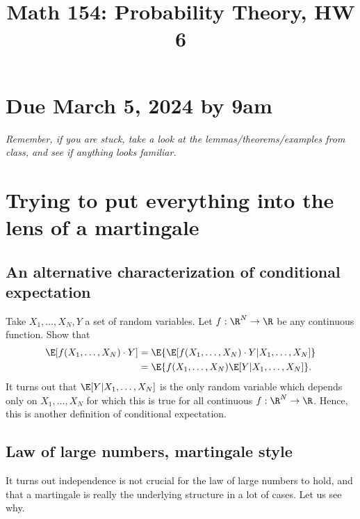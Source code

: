 \documentclass[12pt,reqno]{amsart}
\title{\Large Math 154: Probability Theory, HW 6\vspace{-0.1cm}}
\theoremstyle{definition}
\theoremstyle{remark}
\numberwithin{equation}{section}
\newenvironment{nouppercase}{%
  \let\uppercase\relax%
  \renewcommand{\uppercasenonmath}[1]{}}{}
\begin{document}
\begin{nouppercase}
\maketitle
\end{nouppercase}
\section*{Due March 5, 2024 by 9am}
\emph{Remember, if you are stuck, take a look at the lemmas/theorems/examples from class, and see if anything looks familiar.}
\section{Trying to put everything into the lens of a martingale}
\subsection{An alternative characterization of conditional expectation}
Take $X_{1},\ldots,X_{N},Y$ a set of random variables. Let $f:\R^{N}\to\R$ be any continuous function. Show that 
%
\begin{align*}
\E[f(X_{1},\ldots,X_{N})\cdot Y]&=\E\{\E[f(X_{1},\ldots,X_{N})\cdot Y|X_{1},\ldots,X_{N}]\}\\
&=\E\{f(X_{1},\ldots,X_{N})\E[Y|X_{1},\ldots,X_{N}]\}.
\end{align*}
%
It turns out that $\E[Y|X_{1},\ldots,X_{N}]$ is the only random variable which depends only on $X_{1},\ldots,X_{N}$ for which this is true for all continuous $f:\R^{N}\to\R$. Hence, this is another definition of conditional expectation.
\subsection{Law of large numbers, martingale style}
It turns out independence is not crucial for the law of large numbers to hold, and that a martingale is really the underlying structure in a lot of cases. Let us see why.
\end{document}
